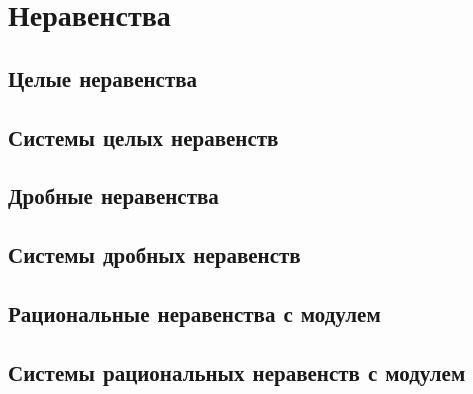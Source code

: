 \documentclass[10pt, a4paper]{article}
\begin{document}
\section{Неравенства}
	\subsection{Целые неравенства}
	\subsection{Системы целых неравенств}
	\subsection{Дробные неравенства}
	\subsection{Системы дробных неравенств}
	\subsection{Рациональные неравенства с модулем}
	\subsection{Системы рациональных неравенств с модулем}
\end{document}

